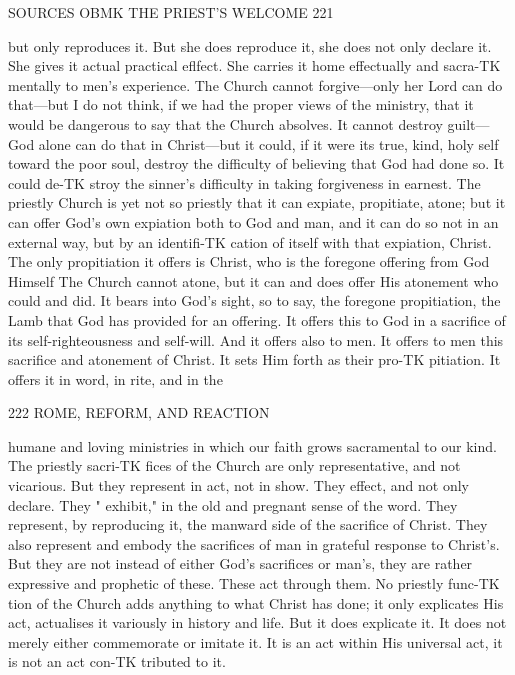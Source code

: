 \documentclass[12pt,a5paper,twoside]{book}
\begin{document}
{{SOURCES OBMK THE PRIEST'S WELCOME 221 

but only reproduces it. But she does reproduce it, she 
does not only declare it. She gives it actual practical 
eflfect. She carries it home effectually and sacra-TK
mentally to men's experience. The Church cannot 
forgive---only her Lord can do that---but I do not 
think, if we had the proper views of the ministry, 
that it would be dangerous to say that the Church 
absolves. It cannot destroy guilt---God alone can do 
that in Christ---but it could, if it were its true, kind, 
holy self toward the poor soul, destroy the difficulty 
of believing that God had done so. It could de-TK
stroy the sinner's difficulty in taking forgiveness in 
earnest. The priestly Church is yet not so priestly 
that it can expiate, propitiate, atone; but it can offer 
God's own expiation both to God and man, and it 
can do so not in an external way, but by an identifi-TK
cation of itself with that expiation, Christ. The only 
propitiation it offers is Christ, who is the foregone 
offering from God Himself The Church cannot 
atone, but it can and does offer His atonement who 
could and did. It bears into God's sight, so to say, 
the foregone propitiation, the Lamb that God has 
provided for an offering. It offers this to God in a 
sacrifice of its self-righteousness and self-will. And it 
offers also to men. It offers to men this sacrifice and 
atonement of Christ. It sets Him forth as their pro-TK
pitiation. It offers it in word, in rite, and in the 



222 ROME, REFORM, AND REACTION 

humane and loving ministries in which our faith 
grows sacramental to our kind. The priestly sacri-TK
fices of the Church are only representative, and not 
vicarious. But they represent in act, not in show. 
They effect, and not only declare. They " exhibit," 
in the old and pregnant sense of the word. They 
represent, by reproducing it, the manward side of the 
sacrifice of Christ. They also represent and embody 
the sacrifices of man in grateful response to Christ's. 
But they are not instead of either God's sacrifices or 
man's, they are rather expressive and prophetic of 
these. These act through them. No priestly func-TK
tion of the Church adds anything to what Christ has 
done; it only explicates His act, actualises it variously 
in history and life. But it does explicate it. It does 
not merely either commemorate or imitate it. It is 
an act within His universal act, it is not an act con-TK
tributed to it. 

}}
\end{document}

